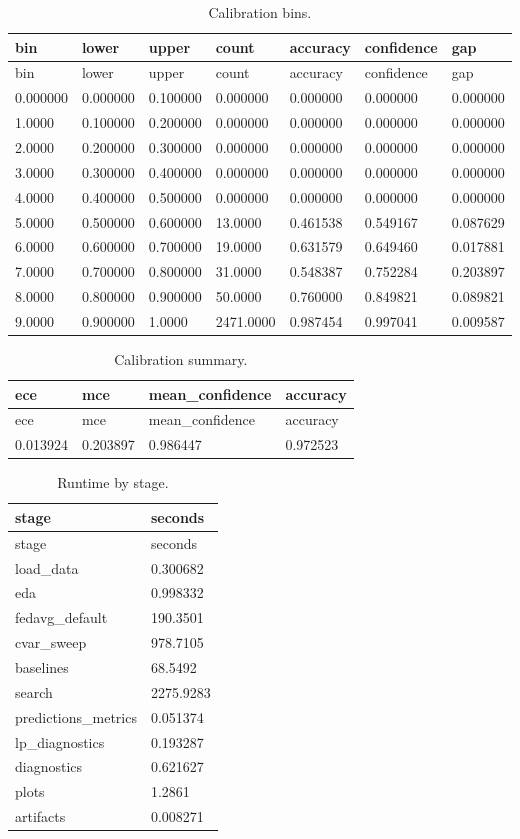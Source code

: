 \documentclass[11pt]{report}
\begin{document}
\begin{longtable}{lllllll}
\caption{Calibration bins.}\\
\toprule
bin & lower & upper & count & accuracy & confidence & gap \\
\midrule
\endfirsthead
\toprule
bin & lower & upper & count & accuracy & confidence & gap \\
\midrule
\endhead
0.000000 & 0.000000 & 0.100000 & 0.000000 & 0.000000 & 0.000000 & 0.000000 \\
1.0000 & 0.100000 & 0.200000 & 0.000000 & 0.000000 & 0.000000 & 0.000000 \\
2.0000 & 0.200000 & 0.300000 & 0.000000 & 0.000000 & 0.000000 & 0.000000 \\
3.0000 & 0.300000 & 0.400000 & 0.000000 & 0.000000 & 0.000000 & 0.000000 \\
4.0000 & 0.400000 & 0.500000 & 0.000000 & 0.000000 & 0.000000 & 0.000000 \\
5.0000 & 0.500000 & 0.600000 & 13.0000 & 0.461538 & 0.549167 & 0.087629 \\
6.0000 & 0.600000 & 0.700000 & 19.0000 & 0.631579 & 0.649460 & 0.017881 \\
7.0000 & 0.700000 & 0.800000 & 31.0000 & 0.548387 & 0.752284 & 0.203897 \\
8.0000 & 0.800000 & 0.900000 & 50.0000 & 0.760000 & 0.849821 & 0.089821 \\
9.0000 & 0.900000 & 1.0000 & 2471.0000 & 0.987454 & 0.997041 & 0.009587 \\
\bottomrule
\end{longtable}
\begin{longtable}{llll}
\caption{Calibration summary.}\\
\toprule
ece & mce & mean\_confidence & accuracy \\
\midrule
\endfirsthead
\toprule
ece & mce & mean\_confidence & accuracy \\
\midrule
\endhead
0.013924 & 0.203897 & 0.986447 & 0.972523 \\
\bottomrule
\end{longtable}
\begin{longtable}{ll}
\caption{Runtime by stage.}\\
\toprule
stage & seconds \\
\midrule
\endfirsthead
\toprule
stage & seconds \\
\midrule
\endhead
load\_data & 0.300682 \\
eda & 0.998332 \\
fedavg\_default & 190.3501 \\
cvar\_sweep & 978.7105 \\
baselines & 68.5492 \\
search & 2275.9283 \\
predictions\_metrics & 0.051374 \\
lp\_diagnostics & 0.193287 \\
diagnostics & 0.621627 \\
plots & 1.2861 \\
artifacts & 0.008271 \\
\bottomrule
\end{longtable}
\end{document}
